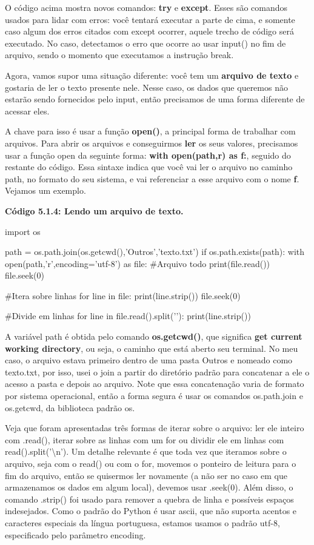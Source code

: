 \documentclass[11pt, a4paper]{article}
\begin{document}
O código acima mostra novos comandos: \textbf{try} e \textbf{except}. Esses são comandos usados para lidar com erros: você tentará executar a parte de cima, e somente caso algum dos erros citados com except ocorrer, aquele trecho de código será executado. No caso, detectamos o erro que ocorre ao usar input() no fim de arquivo, sendo o momento que executamos a instrução break.

Agora, vamos supor uma situação diferente: você tem um \textbf{arquivo de texto} e gostaria de ler o texto presente nele. Nesse caso, os dados que queremos não estarão sendo fornecidos pelo input, então precisamos de uma forma diferente de acessar eles.

A chave para isso é usar a função \textbf{open()}, a principal forma de trabalhar com arquivos. Para abrir os arquivos e conseguirmos \textbf{ler} os seus valores, precisamos usar a função open da seguinte forma: \textbf{with open(path,r) as f:}, seguido do restante do código. Essa sintaxe indica que você vai ler o arquivo no caminho path, no formato do seu sistema, e vai referenciar a esse arquivo com o nome \textbf{f}. Vejamos um exemplo.

\textbf{Código 5.1.4: Lendo um arquivo de texto.}

\begin{code}
import os

path = os.path.join(os.getcwd(),'Outros','texto.txt')
if os.path.exists(path):
    with open(path,'r',encoding='utf-8') as file:
        #Arquivo todo
        print(file.read())
        file.seek(0)
        
        #Itera sobre linhas
        for line in file:
            print(line.strip())
        file.seek(0)
            
        #Divide em linhas
        for line in file.read().split('\n'):
            print(line.strip())
\end{code}

A variável path é obtida pelo comando \textbf{os.getcwd()}, que significa \textbf{get current working directory}, ou seja, o caminho que está aberto seu terminal. No meu caso, o arquivo estava primeiro dentro de uma pasta Outros e nomeado como texto.txt, por isso, usei o join a partir do diretório padrão para concatenar a ele o acesso a pasta e depois ao arquivo. Note que essa concatenação varia de formato por sistema operacional, então a forma segura é usar os comandos os.path.join e os.getcwd, da biblioteca padrão os.

Veja que foram apresentadas três formas de iterar sobre o arquivo: ler ele inteiro com .read(), iterar sobre as linhas com um for ou dividir ele em linhas com read().split('\textbackslash n'). Um detalhe relevante é que toda vez que iteramos sobre o arquivo, seja com o read() ou com o for, movemos o ponteiro de leitura para o fim do arquivo, então se quisermos ler novamente (a não ser no caso em que armazenamos os dados em algum local), devemos usar .seek(0). Além disso, o comando .strip() foi usado para remover a quebra de linha e possíveis espaços indesejados. Como o padrão do Python é usar ascii, que não suporta acentos e caracteres especiais da língua portuguesa, estamos usamos o padrão utf-8, especificado pelo parâmetro encoding. 
\end{document}
